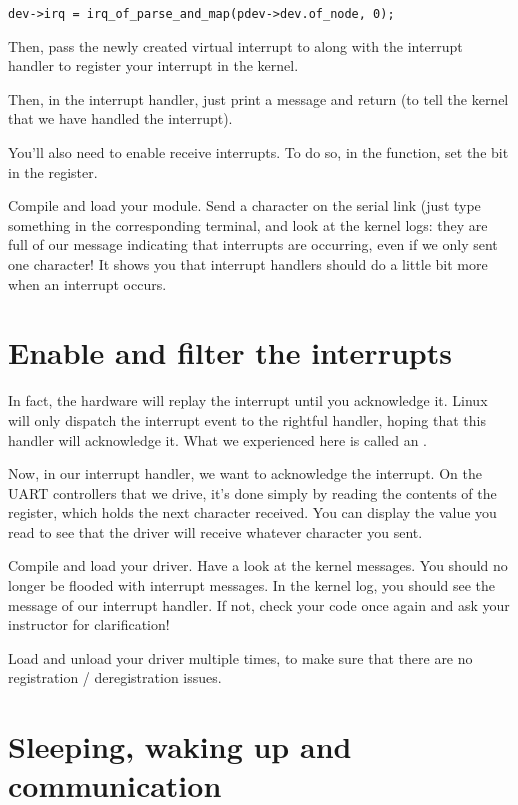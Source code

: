 \begin{verbatim}
dev->irq = irq_of_parse_and_map(pdev->dev.of_node, 0);
\end{verbatim}

Then, pass the newly created virtual interrupt to 
along with the interrupt handler to register your interrupt in the
kernel.

Then, in the interrupt handler, just print a message and return
 (to tell the kernel that we have handled the
interrupt).

You'll also need to enable receive interrupts.
To do so, in the  function, set the
 bit in the  register.

Compile and load your module. Send a character on the serial link (just
type something in the corresponding  terminal, and
look at the kernel logs: they are full of our message indicating that
interrupts are occurring, even if we only sent one character! It shows
you that interrupt handlers should do a little bit more when an
interrupt occurs.

\section{Enable and filter the interrupts}

In fact, the hardware will replay the interrupt until you acknowledge
it. Linux will only dispatch the interrupt event to the rightful
handler, hoping that this handler will acknowledge it. What we
experienced here is called an .

Now, in our interrupt handler, we want to acknowledge the
interrupt. On the UART controllers that we drive, it's done simply by
reading the contents of the  register, which holds the
next character received. You can display the value you read to see
that the driver will receive whatever character you sent.

Compile and load your driver. Have a look at the kernel messages. You
should no longer be flooded with interrupt messages. In the kernel
log, you should see the message of our interrupt handler. If not,
check your code once again and ask your instructor for clarification!

Load and unload your driver multiple times, to make sure that 
there are no registration / deregistration issues.

\section{Sleeping, waking up and communication}

